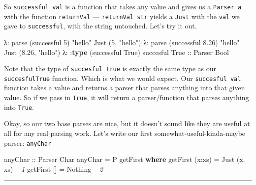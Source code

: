 \documentclass[]{article}
\newenvironment{Shaded}{}{}
\newcommand{\CommentTok}[1]{\textcolor[rgb]{0.38,0.63,0.69}{\textit{#1}}}
\newcommand{\DataTypeTok}[1]{\textcolor[rgb]{0.56,0.13,0.00}{#1}}
\newcommand{\DecValTok}[1]{\textcolor[rgb]{0.25,0.63,0.44}{#1}}
\newcommand{\FloatTok}[1]{\textcolor[rgb]{0.25,0.63,0.44}{#1}}
\newcommand{\FunctionTok}[1]{\textcolor[rgb]{0.02,0.16,0.49}{#1}}
\newcommand{\KeywordTok}[1]{\textcolor[rgb]{0.00,0.44,0.13}{\textbf{#1}}}
\newcommand{\NormalTok}[1]{#1}
\newcommand{\OtherTok}[1]{\textcolor[rgb]{0.00,0.44,0.13}{#1}}
\newcommand{\StringTok}[1]{\textcolor[rgb]{0.25,0.44,0.63}{#1}}
\begin{document}
So \texttt{successful\ val} is a function that takes any value and gives us a
\texttt{Parser\ a} with the function \texttt{returnVal} ---
\texttt{returnVal\ str} yields a \texttt{Just} with the \texttt{val} we gave to
\texttt{successful}, with the string untouched. Let's try it out.

\begin{Shaded}
\begin{Highlighting}[]
\NormalTok{λ}\FunctionTok{:}\NormalTok{ parse (successful }\DecValTok{5}\NormalTok{) }\StringTok{"hello"}
\DataTypeTok{Just}\NormalTok{ (}\DecValTok{5}\NormalTok{, }\StringTok{"hello"}\NormalTok{)}
\NormalTok{λ}\FunctionTok{:}\NormalTok{ parse (successful }\FloatTok{8.26}\NormalTok{) }\StringTok{"hello"}
\DataTypeTok{Just}\NormalTok{ (}\FloatTok{8.26}\NormalTok{, }\StringTok{"hello"}\NormalTok{)}
\NormalTok{λ}\FunctionTok{:} \FunctionTok{:}\KeywordTok{type}\NormalTok{ (successful }\DataTypeTok{True}\NormalTok{)}
\NormalTok{succesful }\DataTypeTok{True}\OtherTok{ ::} \DataTypeTok{Parser} \DataTypeTok{Bool}
\end{Highlighting}
\end{Shaded}

Note that the type of \texttt{succesful\ True} is exactly the same type as our
\texttt{succesfulTrue} function. Which is what we would expect. Our
\texttt{succesful\ val} function takes a value and returns a parser that parses
anything into that given value. So if we pass in \texttt{True}, it will return a
parser/function that parses anything into \texttt{True}.

Okay, so our two base parses are nice, but it doesn't sound like they are useful
at all for any real parsing work. Let's write our first
somewhat-useful-kinda-maybe parser: \texttt{anyChar}

\begin{Shaded}
\begin{Highlighting}[]
\OtherTok{anyChar ::} \DataTypeTok{Parser} \DataTypeTok{Char}
\NormalTok{anyChar }\FunctionTok{=} \DataTypeTok{P}\NormalTok{ getFirst}
    \KeywordTok{where}
\NormalTok{        getFirst (x}\FunctionTok{:}\NormalTok{xs) }\FunctionTok{=} \DataTypeTok{Just}\NormalTok{ (x, xs)          }\CommentTok{-- 1}
\NormalTok{        getFirst []     }\FunctionTok{=} \DataTypeTok{Nothing}               \CommentTok{-- 2}
\end{Highlighting}
\end{Shaded}

\begin{center}\rule{0.5\linewidth}{\linethickness}\end{center}
\end{document}
